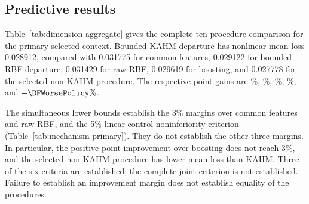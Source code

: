 \subsection{Predictive results}

Table~\ref{tab:dimension-aggregate} gives the complete ten-procedure
comparison for the primary selected context. Bounded KAHM departure has
nonlinear mean loss 0.028912, compared with 0.031775 for common features,
0.029122 for bounded RBF departure, 0.031429 for raw RBF, 0.029619 for
boosting, and 0.027778 for the selected non-KAHM procedure. The respective
point gains are \DFGainCommon\%, \DFGainRBF\%, \DFGainRawRBF\%,
\DFGainHGB\%, and $-\DFWorsePolicy\%$.

\begin{table}[t]
\centering\small
\caption{All ten primary procedures after independent B selection and C
calibration. Entries average A-variance-normalized D MSE over 24
repetitions and, within each panel, equally over its law--noise conditions
and three horizons. The nonlinear and linear panels have different loss
scales and are not pooled for inference. ``Unbounded'' removes only the
departure's radial bound. Lower is better.}
\label{tab:dimension-aggregate}

\end{table}

\begin{table}[t]
\centering\small
\setlength{\tabcolsep}{3.5pt}
\caption{The six primary comparisons for bounded KAHM departure.
$L_K$ and $L_m$ are losses averaged over repetitions. The first five rows
use the nonlinear aggregate and $\bar d=0.97L_m-L_K$; the last uses
the linear aggregate and $\bar d=1.05L_m-L_K$. Gain is
$100(1-L_K/L_m)$, so negative values favor the comparator. The lower
bound concerns the absolute margin contrast, not the percentage gain.
All bounds use 24 independent repetitions, 23 degrees of freedom, and
a one-sided Bonferroni adjustment for six comparisons. A criterion is
satisfied only when its lower bound is positive.}
\label{tab:mechanism-primary}

\end{table}

The simultaneous lower bounds establish the 3\% margins over common
features and raw RBF, and the 5\% linear-control noninferiority criterion
(Table~\ref{tab:mechanism-primary}). They do not establish the other
three margins. In particular, the positive point improvement over boosting
does not reach 3\%, and the selected non-KAHM procedure has lower mean
loss than KAHM. Three of the six criteria are established; the complete
joint criterion is not established. Failure to establish an improvement
margin does not establish equality of the procedures.

